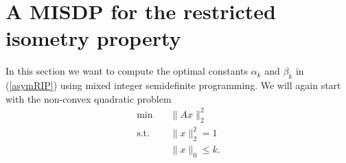 \documentclass[a4paper,11pt,1p]{elsarticle}
\newcommand{\T}{^{\top}}
\begin{document}
 


\section{A MISDP for the restricted isometry property}

In this section we want to compute the optimal constants $\alpha_k$ and $\beta_k$ in (\ref{asymRIP}) using mixed integer semidefinite programming. We will again start with the non-convex quadratic problem
\begin{align}\label{QP2}
 \text{min} \quad & \|Ax\|_2^2 \nonumber \\
 \text{s.t.} \quad & \|x\|_2^2 = 1 \tag{QP} \\
 & \|x\|_0 \leq k. \nonumber
\end{align}
\end{document}
